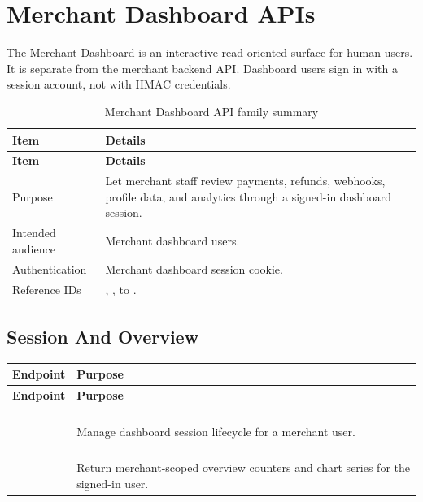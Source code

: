 \section{Merchant Dashboard APIs}

The Merchant Dashboard is an interactive read-oriented surface for human users.
It is separate from the merchant backend API. Dashboard users sign in with a
session account, not with HMAC credentials.

\begin{longtable}{@{}L{0.25\textwidth}L{0.65\textwidth}@{}}
\caption{Merchant Dashboard API family summary}\\
\toprule
\textbf{Item} & \textbf{Details} \\
\midrule
\endfirsthead
\toprule
\textbf{Item} & \textbf{Details} \\
\midrule
\endhead
Purpose & Let merchant staff review payments, refunds, webhooks, profile data,
and analytics through a signed-in dashboard session. \\
\bodyrowrule
Intended audience & Merchant dashboard users. \\
\bodyrowrule
Authentication & Merchant dashboard session cookie. \\
\bodyrowrule
Reference IDs & , ,  to . \\
\bottomrule
\end{longtable}

\subsection{Session And Overview}

\begin{longtable}{@{}L{0.33\textwidth}L{0.57\textwidth}@{}}
\toprule
\textbf{Endpoint} & \textbf{Purpose} \\
\midrule
\endfirsthead
\toprule
\textbf{Endpoint} & \textbf{Purpose} \\
\midrule
\endhead
{} & Manage dashboard
session lifecycle for a merchant user. \\
\bodyrowrule
{} & Return merchant-scoped
overview counters and chart series for the signed-in user. \\
\bottomrule
\end{longtable}

